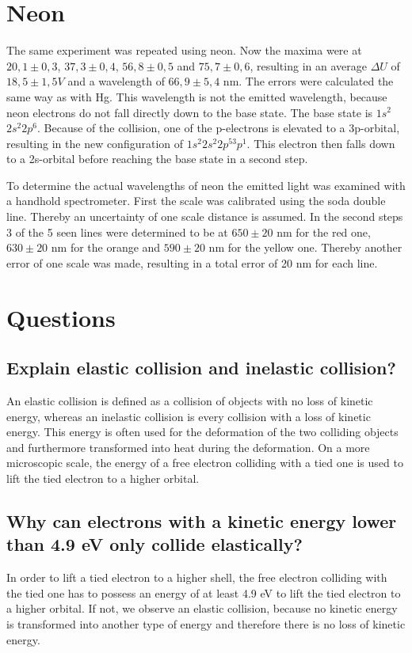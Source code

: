 \documentclass[a4paper,11pt,twoside]{article}
\begin{document}
\section{Neon}
The same experiment was repeated using neon. Now the maxima were at $20,1\pm 0,3$, $37,3\pm 0,4$, $56,8\pm 0,5$ and $75,7\pm 0,6$, resulting in an average $\Delta U$ of $18,5\pm1,5V$ and a wavelength of $66,9\pm5,4$ nm. The errors were calculated the same way as with Hg. This wavelength is not the emitted wavelength, because neon electrons do not fall directly down to the base state. The base state is $1s^2$$2s^2$$2p^6$. Because of the collision, one of the p-electrons is elevated to a 3p-orbital, resulting in the new configuration of $1s^2$$2s^2$$2p^53p^1$. This electron then falls down to a 2s-orbital before reaching the base state in a second step.

To determine the actual wavelengths of neon the emitted light was examined with a handhold spectrometer. First the scale was calibrated using the soda double line. Thereby an uncertainty of one scale distance is assumed. In the second steps 3 of the 5 seen lines were determined to be at $650\pm 20$ nm for the red one, $630\pm20$ nm for the orange and $590\pm 20$ nm for the yellow one. Thereby another error of one scale was made, resulting in a total error of 20 nm for each line. 

\section{Questions}
\subsection{Explain elastic collision and inelastic collision?}
An elastic collision is defined as a collision of objects with no loss of kinetic energy, whereas an inelastic collision is every collision with a loss of kinetic energy. This energy is often used for the deformation of the two colliding objects and furthermore transformed into heat during the deformation. On a more microscopic scale, the energy of a free electron colliding with a tied one is used to lift the tied electron to a higher orbital.

\subsection{Why can electrons with a kinetic energy lower than 4.9 eV only collide elastically?}
In order to lift a tied electron to a higher shell, the free electron colliding with the tied one has to possess an energy of at least 4.9 eV to lift the tied electron to a higher orbital. If not, we observe an elastic collision, because no kinetic energy is transformed into another type of energy and therefore there is no loss of kinetic energy.
\end{document}
